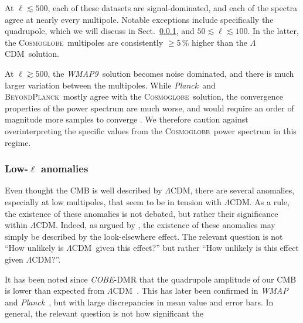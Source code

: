 \documentclass[twocolumn]{../../common/aa}
\def\WMAPnine{\emph{WMAP9}}
\def\COBE{\emph{COBE}}
\def\wmap{\emph{WMAP}}
\def\planck{\emph{Planck}}
\def\LCDM{$\Lambda$CDM}
\newcommand{\bp}{\textsc{BeyondPlanck}}
\newcommand{\cosmoglobe}{\textsc{Cosmoglobe}}
\begin{document}
At $\ell\lesssim500$, each of these datasets are signal-dominated, and each of the spectra agree at nearly every multipole. Notable exceptions include specifically the quadrupole, which we will discuss in Sect.~\ref{sec:anomalies}, and $50\lesssim\ell\lesssim100$. In the latter, the \cosmoglobe\ multipoles are consistently $\geq5\,\%$ higher than the \LCDM\ solution.

At $\ell\gtrsim500$, the \WMAPnine\ solution becomes noise dominated, and there is much larger variation between the multipoles. While \planck\ and \bp\ mostly agree with the \cosmoglobe\ solution, the convergence properties of the power spectrum are much worse, and would require an order of magnitude more samples to converge \citep{bp11}. We therefore caution against overinterpreting the specific values from the \cosmoglobe\ power spectrum in this regime.


\subsubsection{Low-$\ell$ anomalies}
\label{sec:anomalies}

Even thought the CMB is well described by \LCDM, there are several anomalies, especially at low multipoles, that seem to be in tension with \LCDM. As a rule, the existence of these anomalies is not debated, but rather their significance within \LCDM. Indeed, as argued by \citet{bennett2010}, the existence of these anomalies may simply be described by the look-elsewhere effect. The relevant question is not ``How unlikely is \LCDM\ given this effect?'' but rather ``How unlikely is this effect given \LCDM?''.

It has been noted since \COBE-DMR that the quadrupole amplitude of our CMB is lower than expected from \LCDM\ \citep{bennett:1992}. This has later been confirmed in \wmap\ \citep{hinshaw2003a} and \planck\ \citep{planck2013-XV}, but with large discrepancies in mean value and error bars. In general, the relevant question is not how significant the 
\end{document}
